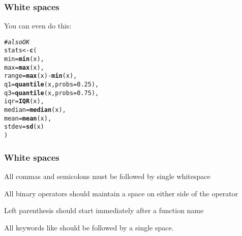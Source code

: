 \documentclass[12pt]{beamer}\usepackage[]{graphicx}\usepackage[]{color}
\makeatletter
\newcommand{\hlnum}[1]{\textcolor[rgb]{0.686,0.059,0.569}{#1}}%
\newcommand{\hlcom}[1]{\textcolor[rgb]{0.678,0.584,0.686}{\textit{#1}}}%
\newcommand{\hlopt}[1]{\textcolor[rgb]{0,0,0}{#1}}%
\newcommand{\hlstd}[1]{\textcolor[rgb]{0.345,0.345,0.345}{#1}}%
\newcommand{\hlkwb}[1]{\textcolor[rgb]{0.69,0.353,0.396}{#1}}%
\newcommand{\hlkwc}[1]{\textcolor[rgb]{0.333,0.667,0.333}{#1}}%
\newcommand{\hlkwd}[1]{\textcolor[rgb]{0.737,0.353,0.396}{\textbf{#1}}}%
\newenvironment{kframe}{%
 \def\at@end@of@kframe{}%
 \ifinner\ifhmode%
  \def\at@end@of@kframe{\end{minipage}}%
  \begin{minipage}{\columnwidth}%
 \fi\fi%
 \def\FrameCommand##1{\hskip\@totalleftmargin \hskip-\fboxsep
 \colorbox{shadecolor}{##1}\hskip-\fboxsep
     \hskip-\linewidth \hskip-\@totalleftmargin \hskip\columnwidth}%
 \MakeFramed {\advance\hsize-\width
   \@totalleftmargin\z@ \linewidth\hsize
   \@setminipage}}%
 {\par\unskip\endMakeFramed%
 \at@end@of@kframe}
\newenvironment{knitrout}{}{} %
\makeatother
\begin{document}

\begin{frame}[fragile]
\frametitle{White spaces}

You can even do this:
\begin{knitrout}\footnotesize
{}\color{fgcolor}\begin{kframe}
\begin{alltt}
\hlcom{# also OK}
\hlstd{stats} \hlkwb{<-} \hlkwd{c}\hlstd{(}
  \hlkwc{min}    \hlstd{=} \hlkwd{min}\hlstd{(x),}
  \hlkwc{max}    \hlstd{=} \hlkwd{max}\hlstd{(x),}
  \hlkwc{range}  \hlstd{=} \hlkwd{max}\hlstd{(x)} \hlopt{-} \hlkwd{min}\hlstd{(x),}
  \hlkwc{q1}     \hlstd{=} \hlkwd{quantile}\hlstd{(x,} \hlkwc{probs} \hlstd{=} \hlnum{0.25}\hlstd{),}
  \hlkwc{q3}     \hlstd{=} \hlkwd{quantile}\hlstd{(x,} \hlkwc{probs} \hlstd{=} \hlnum{0.75}\hlstd{),}
  \hlkwc{iqr}    \hlstd{=} \hlkwd{IQR}\hlstd{(x),}
  \hlkwc{median} \hlstd{=} \hlkwd{median}\hlstd{(x),}
  \hlkwc{mean}   \hlstd{=} \hlkwd{mean}\hlstd{(x),}
  \hlkwc{stdev}  \hlstd{=} \hlkwd{sd}\hlstd{(x)}
\hlstd{)}
\end{alltt}
\end{kframe}
\end{knitrout}

\end{frame}


\begin{frame}[fragile]
\frametitle{White spaces}

\bbi
  \item All commas and semicolons must be followed by single whitespace
  \item All binary operators should maintain a space on either side of the operator
  \item Left parenthesis should start immediately after a function name
  \item All keywords like  should be followed by a single space.
\ei

\end{frame}

\end{document}
